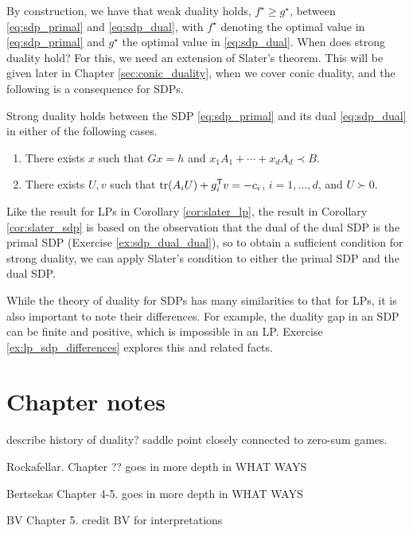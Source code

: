 By construction, we have that weak duality holds, $f^\star \geq g^\star$,
between \eqref{eq:sdp_primal} and \eqref{eq:sdp_dual}, with $f^\star$ denoting 
the optimal value in \eqref{eq:sdp_primal} and $g^\star$ the optimal value in 
\eqref{eq:sdp_dual}. When does strong duality hold? For this, we need an
extension of Slater's theorem. This will be given later in Chapter
\ref{sec:conic_duality}, when we cover conic duality, and the following is a    
consequence for SDPs. 

\begin{Corollary}
\label{cor:slater_sdp}
Strong duality holds between the SDP \eqref{eq:sdp_primal} and its dual
\eqref{eq:sdp_dual} in either of the following cases. 

\begin{enumerate}[label=(\roman*)]
\item There exists $x$ such that $Gx = h$ and $x_1 A_1 + \cdots + x_d A_d \prec
  B$.  
\item There exists $U,v$ such that $\operatorname{tr}(A_iU) + g_i^{\mathsf{T}} v = -c_i$, $i =
  1,\dots,d$, and $U \succ 0$. 
\end{enumerate}
\end{Corollary}

Like the result for LPs in Corollary \ref{cor:slater_lp}, the result in
Corollary \ref{cor:slater_sdp} is based on the observation that the dual of the 
dual SDP is the primal SDP (Exercise \ref{ex:sdp_dual_dual}), so to obtain
a sufficient condition for strong duality, we can apply Slater's condition to
either the primal SDP and the dual SDP. 

While the theory of duality for SDPs has many similarities to that for LPs, it is
also important to note their differences. For example, the duality gap in an SDP
can be finite and positive, which is impossible in an LP. Exercise
\ref{ex:lp_sdp_differences} explores this and related facts.     

\SkipTocEntry\section*{Chapter notes}

describe history of duality? saddle point closely connected to zero-sum games. 

Rockafellar. Chapter ?? goes in more depth in WHAT WAYS

Bertsekas Chapter 4-5. goes in more depth in WHAT WAYS

BV Chapter 5. credit BV for interpretations


